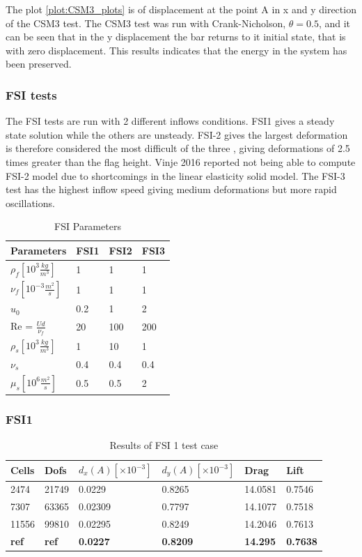 The plot \ref{plot:CSM3_plots} is of displacement at the point A in x and y direction of the CSM3 test. The CSM3 test was run with Crank-Nicholson, $\theta = 0.5$, and it can be seen that in the y displacement the bar returns to it initial state, that is with zero displacement. This results indicates that the energy in the system has been preserved.

\subsubsection*{FSI tests}
The FSI tests are run with 2 different inflows conditions. FSI1 gives a steady state solution while the others are unsteady. FSI-2 gives the largest deformation is therefore considered the most difficult of the three \cite{Richter2013}, giving deformations of 2.5 times greater than the flag height. Vinje 2016 \cite{Vinje2016} reported not being able to compute FSI-2 model due to shortcomings in the linear elasticity solid model. The FSI-3 test has the highest inflow speed giving medium deformations but more rapid oscillations.


\begin{table}[h!]
\centering
\caption{FSI Parameters}
\label{my-label}
\begin{tabular}{|l|l|l|l|}
\hline
Parameters & FSI1 & FSI2 & FSI3 \\ \hline
$\rho_f[10^3 \frac{kg}{m^3}]$ & 1 & 1 & 1 \\ \hline
$\nu_f [10^{-3} \frac{m^2}{s}]$ & 1 & 1 & 1 \\ \hline
$u_0$ & 0.2 & 1 & 2 \\ \hline
Re = $\frac{U d}{\nu_f}$ & 20 & 100 & 200 \\ \hline
$\rho_s[10^3 \frac{kg}{m^3}]$ & 1 & 10 & 1 \\ \hline
$\nu_s$ & 0.4 & 0.4 & 0.4 \\ \hline
$\mu_s[10^6 \frac{m^2}{s}]$ & 0.5 & 0.5 & 2 \\ \hline
\end{tabular}
\end{table}

\subsubsection*{FSI1}
\begin{table}[H]
\centering
\caption{Results of FSI 1 test case}
\label{my-label}
\begin{tabular}{|l|l|l|l|l|l|}
\hline
Cells & Dofs & $d_x(A) [\times10^{-3}]$ & $d_y(A)[\times10^{-3}]$ & Drag & Lift \\ \hline
2474 & 21749 & 0.0229 & 0.8265 & 14.0581 & 0.7546 \\ \hline
7307 & 63365 & 0.02309 & 0.7797 & 14.1077 & 0.7518 \\ \hline
11556 & 99810 & 0.02295 & 0.8249 & 14.2046 & 0.7613 \\ \hline
\textbf{ref} & \textbf{ref} & \textbf{0.0227} & \textbf{0.8209} & \textbf{14.295} & \textbf{0.7638} \\ \hline
\end{tabular}
\end{table}

